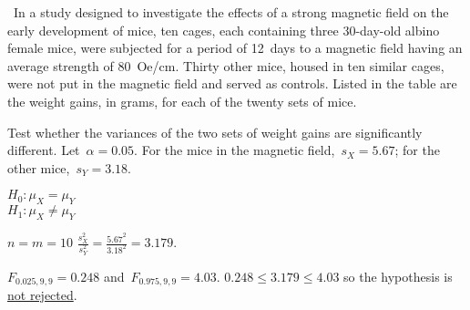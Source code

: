 \begin{problem}
  ~In a study designed to investigate the effects of a strong magnetic field on the early development of mice, ten cages, each containing three 30-day-old albino female mice, were subjected for a period of 12~days to a magnetic field having an average strength of 80~Oe/cm. Thirty other mice, housed in ten similar cages, were not put in the magnetic field and served as controls. Listed in the table are the weight gains, in grams, for each of the twenty sets of mice.

Test whether the variances of the two sets of weight gains are significantly different. Let~${\alpha = 0.05}$. For the mice in the magnetic field,~${s_X = 5.67}$; for the other mice,~${s_Y = 3.18}$.
\end{problem}

\noindent
${H_0: \mu_{X} = \mu_{Y}}$ \\
${H_1:  \mu_{X} \ne \mu_{Y}}$

\noindent
${n = m = 10}$  ${\frac{s^{2}_{X}}{s^{2}_{Y}} = \frac{5.67^2}{3.18^2} = 3.179}$.

\noindent
${F_{0.025,9,9} = 0.248}$ and~${F_{0.975,9,9} = 4.03}$.  ${0.248 \leq 3.179 \leq 4.03}$ so the hypothesis is \underline{not rejected}.
